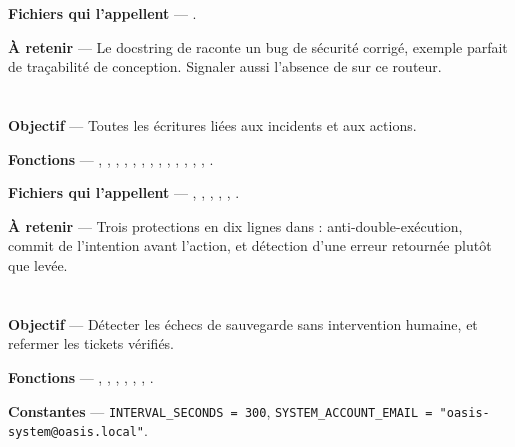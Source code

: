 \textbf{Fichiers qui l'appellent} --- .

\textbf{À retenir} --- Le docstring de  raconte un bug de
sécurité corrigé, exemple parfait de traçabilité de conception. Signaler aussi
l'absence de  sur ce routeur.

\section{}

\textbf{Objectif} --- Toutes les écritures liées aux incidents et aux actions.

\textbf{Fonctions} --- ,
, ,
, ,
, , ,
, , ,
, , .

\textbf{Fichiers qui l'appellent} --- , ,
, ,
, .

\textbf{À retenir} --- Trois protections en dix lignes dans
 : anti-double-exécution, commit de
l'intention avant l'action, et détection d'une erreur retournée plutôt que
levée.

\section{}

\textbf{Objectif} --- Détecter les échecs de sauvegarde sans intervention
humaine, et refermer les tickets vérifiés.

\textbf{Fonctions} --- , ,
, , ,
, .

\textbf{Constantes} --- \texttt{INTERVAL\_SECONDS = 300},
\texttt{SYSTEM\_ACCOUNT\_EMAIL = "oasis-system@oasis.local"}.

